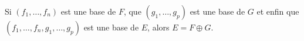 Si $(f_1,\ldots,f_n)$ est une base de $F$, que $(g_1,\ldots,g_p)$ est une base de $G$ et enfin que $(f_1,\ldots,f_n,g_1,\ldots,g_p)$ est une base de $E$, alors $E=F\oplus G$.

\begin{reponses}
\end{reponses}

